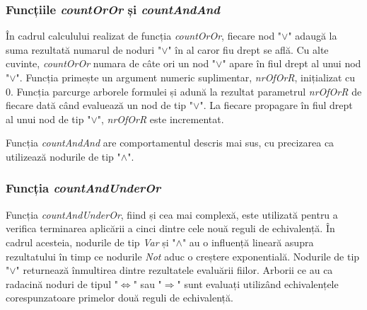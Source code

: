 \subsubsection{Funcțiile \textit{countOrOr} și \textit{countAndAnd}}

În cadrul calculului realizat de funcția \textit{countOrOr}, fiecare nod "$\lor$" adaugă la suma rezultată numarul de noduri "$\lor$" în al caror fiu drept se află.
Cu alte cuvinte, \textit{countOrOr} numara de câte ori un nod "$\lor$" apare în fiul drept al unui nod "$\lor$". Funcția primește un argument numeric suplimentar, \textit{nrOfOrR}, inițializat cu 0. Funcția parcurge arborele formulei și adună la rezultat parametrul \textit{nrOfOrR} de fiecare dată când evaluează un nod de tip "$\lor$". La fiecare propagare în fiul drept al unui nod de tip "$\lor$", \textit{nrOfOrR} este incrementat. 

Funcția \textit{countAndAnd} are comportamentul descris mai sus, cu precizarea ca utilizează nodurile de tip "$\land$".

\subsubsection{Funcția \textit{countAndUnderOr}}

Funcția \textit{countAndUnderOr}, fiind și cea mai complexă, este utilizată pentru a verifica terminarea aplicării a cinci dintre cele nouă reguli de echivalență. În cadrul acesteia, nodurile de tip \textit{Var} și "$\land$" au o influență lineară asupra rezultatului în timp ce nodurile \textit{Not} aduc o creștere exponentială. Nodurile de tip "$\lor$" returnează înmultirea dintre rezultatele evaluării fiilor. Arborii ce au ca radacină noduri de tipul "$\Leftrightarrow$" sau "$\Rightarrow$" sunt evaluați utilizând echivalențele corespunzatoare primelor două reguli de echivalență.

